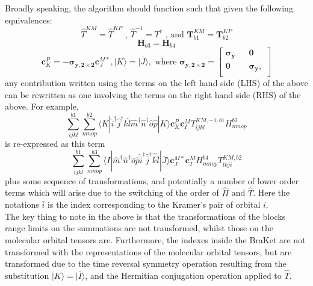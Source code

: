 \noindent Broadly speaking, the algorithm should function such that
given the following equivalences:
\begin{equation*}
\hat{T}^{KM}= \hat{T}^{KP} \text{\ , \ \ \  }
\hat{T}^{-1} = T^{\dagger} \text{\ , and \ \ \ }
\mathbf{T}_{b1}^{KM}= \mathbf{T}_{b2}^{KP} 
\end{equation*}
\begin{equation*} 
\mathbf{H}_{b3} = \mathbf{H}_{b4} 
\end{equation*}
\begin{equation*} 
\mathbf{c}_{K}^{P} =  -\boldsymbol{\sigma_{y,2\times 2}}\mathbf{c}_{J}^{M*}, 
|K\rangle =  |\overline{J}\rangle, 
\text{ \ \ \ where  \ \ \ } 
\boldsymbol{\sigma_{y,2\times 2}} = 
\begin{bmatrix}
\boldsymbol{\sigma_{y}} && \mathbf{0} \\ 
\mathbf{0} && \boldsymbol{\sigma_{y}}, \\
\end{bmatrix}
\end{equation*}
\noindent any contribution written using the terms on the left
hand side (LHS) of the above can be rewritten as one involving the terms on the
right hand side (RHS) of the above. For example, 
\begin{equation*}
\sum_{ijkl}^{b1}\sum_{mnop}^{b2} \langle K |
\hat{i}^{\dagger}\hat{j}^{\dagger}\hat{k}\hat{l}\hat{m}^{\dagger}\hat{n}^{\dagger}\hat{o}\hat{p} | K \rangle 
\mathbf{c}_{K}^{P}\mathbf{c}_{I}^{M}T_{ijkl}^{KM,-1,b1}H^{b3}_{mnop}
\end{equation*}
is re-expressed as this term
\begin{equation*}
\sum_{ijkl}^{b1}\sum^{b3}_{mnop}
\langle I |
\hat{m}^{\dagger}\hat{n}^{\dagger}\hat{o}\hat{p} 
\hat{\overline{i}}^{\dagger}\hat{\overline{j}}^{\dagger}\hat{\overline{k}}\hat{\overline{l}}
| \overline{J} \rangle 
\mathbf{c}_{J}^{M*} \mathbf{c}_{I}^{M}
H^{b4}_{mnop}T_{lkji}^{KM,b2}
\end{equation*}
plus some sequence of transformations, and potentially a number of lower order
terms which will arise due to the switching of the order of $\hat{H}$ and
$\hat{T}$. Here the notations $\overline{i}$ is the index corresponding to the
Kramer's pair of orbital $i$. \\

\noindent The key thing to note in the above is that the transformations of the
blocks range limits on the summations are not transformed, whilst those on the
molecular orbital tensors are. Furthermore, the indexes inside the BraKet are
not transformed with the representations of the molecular orbital tensors, but
are transformed due to the time reversal symmetry operation resulting from the
substitution $|K\rangle = |\overline{I}\rangle$, and the Hermitian conjugation
operation applied to $\hat{T}$.\\

